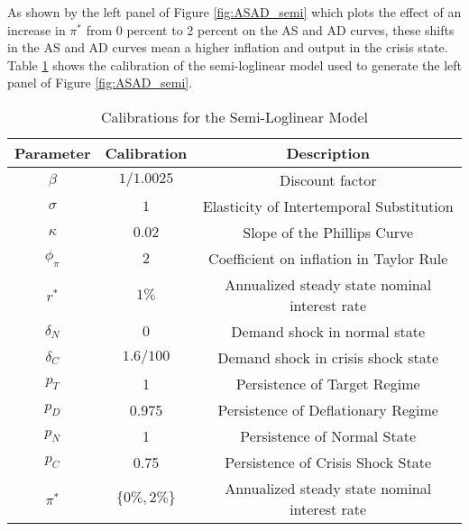\documentclass[11pt]{article}
\begin{document}
\begin{singlespace}
		As shown by the left panel of Figure \ref{fig:ASAD_semi} which plots the effect of an increase in $\pi^*$ from 0 percent to 2 percent on the AS and AD curves, these shifts in the AS and AD curves mean a higher inflation and output in the crisis state. Table \ref{calib} shows the calibration of the semi-loglinear model used to generate the left panel of Figure \ref{fig:ASAD_semi}.
		\begin{table}
			\centering
			\caption{Calibrations for the Semi-Loglinear Model\label{calib}}
{\footnotesize
			\begin{tabular}{ccc}
				\hline
				\hline
				Parameter & Calibration & Description\\
				\hline
				$\beta$ & $1/1.0025$ & Discount factor \\
				$\sigma$ & $1$ & Elasticity of Intertemporal Substitution\\
				$\kappa$  & $0.02$ & Slope of the Phillips Curve \\
				$\phi_{\pi}$ & $2$ & Coefficient on inflation in Taylor Rule \\
				$r^*$ & $1\%$ & Annualized steady state nominal interest rate \\
				$\delta_N$ & $0$ & Demand shock in normal state \\
				$\delta_C$ & $1.6/100$ & Demand shock in crisis shock state \\
				\hline
				$p_T$ & 1 & Persistence of Target Regime \\
				$p_D$ & 0.975 & Persistence of Deflationary Regime \\
				$p_{N}$ & 1 & Persistence of Normal State \\
				$p_C$ & 0.75 & Persistence of Crisis Shock State \\
				\hline 
				$\pi^*$ & $\{0\%, 2\%\}$ & Annualized steady state nominal interest rate \\
				\hline
				\hline
			\end{tabular}
}		\end{table}


\end{singlespace}
\end{document}
